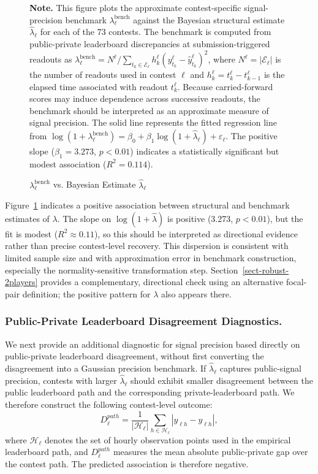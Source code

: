\documentclass[mnsc]{informs3}
\begin{document}
\begin{figure}[tbp]
\begin{minipage}[t]{0.53\textwidth}
\end{minipage}
\caption{$\lambda_\ell^{\text{bench}}$ vs. Bayesian Estimate $\hat\lambda_\ell$}
\label{fig-validate-lambda}
\begin{minipage}{\textwidth}
{\footnotesize
\textbf{Note.} This figure plots the approximate contest-specific signal-precision benchmark $\lambda_\ell^{\mathrm{bench}}$ against the Bayesian structural estimate $\hat{\lambda}_\ell$ for each of the 73 contests. The benchmark is computed from public-private leaderboard discrepancies at submission-triggered readouts as $\lambda_\ell^{\mathrm{bench}} = N^\ell / \sum_{t_k\in\mathcal E_\ell} h_k^\ell (y_{t_k}^\ell - \hat{y}_{t_k}^\ell)^2$, where $N^\ell=|\mathcal E_\ell|$ is the number of readouts used in contest $\ell$ and $h_k^\ell=t_k^\ell-t_{k-1}^\ell$ is the elapsed time associated with readout $t_k^\ell$. Because carried-forward scores may induce dependence across successive readouts, the benchmark should be interpreted as an approximate measure of signal precision. 
The solid line represents the fitted regression line from $\log(1 + \lambda_\ell^{\mathrm{bench}}) = \beta_0 + \beta_1 \log(1 + \hat{\lambda}_\ell) + \varepsilon_\ell$. The positive slope ($\beta_1 = 3.273$, $p < 0.01$) indicates a statistically significant but modest association ($R^2 = 0.114$).
}
\end{minipage}
\end{figure}


Figure~\ref{fig-validate-lambda} indicates a positive association between structural and benchmark estimates of $\lambda$.
The slope on $\log(1+\hat\lambda)$ is positive (3.273, $p<0.01$), but the fit is modest ($R^2\approx0.11$), so this should be interpreted as directional evidence rather than precise contest-level recovery.
This dispersion is consistent with limited sample size and with approximation error in benchmark construction, especially the normality-sensitive transformation step.
Section~\ref{sect-robust-2players} provides a complementary, directional check using an alternative focal-pair definition; the positive pattern for $\lambda$ also appears there.


\subsubsection{Public-Private Leaderboard Disagreement Diagnostics.}
We next provide an additional diagnostic for signal precision based directly on public-private leaderboard disagreement, without first converting the disagreement into a Gaussian precision benchmark.
If $\hat\lambda_\ell$ captures public-signal precision, contests with larger $\hat\lambda_\ell$ should exhibit smaller disagreement between the public leaderboard path and the corresponding private-leaderboard path.
We therefore construct the following contest-level outcome:
\[
D_\ell^{path}
=
\frac{1}{|\mathcal H_\ell|}
\sum_{h\in\mathcal H_\ell}
\left|y_{\ell h}-\hat y_{\ell h}\right|,
\]
where $\mathcal H_\ell$ denotes the set of hourly observation points used in the empirical leaderboard path, and $D_\ell^{path}$ measures the mean absolute public-private gap over the contest path.
The predicted association is therefore negative.
\end{document}
